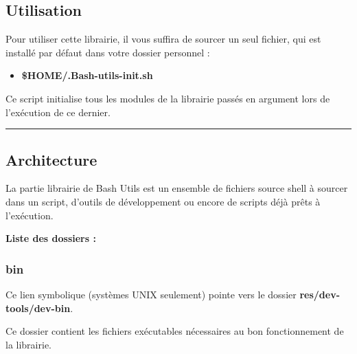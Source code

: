\documentclass[a4paper,10pt]{article}
\begin{document}
\color{sec2}
\subsection{Utilisation}\color{text}

\begin{justify}
    Pour utiliser cette librairie, il vous suffira de sourcer un seul fichier, qui est installé par défaut dans votre dossier personnel :

    \begin{itemize}
        \item \textbf{\color{vars}\$HOME\color{path}/.Bash-utils-init.sh}
    \end{itemize}
\end{justify}

\begin{justify}
    Ce script initialise tous les modules de la librairie passés en argument lors de l'exécution de ce dernier.
\end{justify}




\color{sec2}\par\noindent\rule{\textwidth}{0.4pt}\color{text}

\color{sec2}
\subsection{Architecture}\color{text}

\begin{justify}
    La partie librairie de Bash Utils est un ensemble de fichiers source shell à sourcer dans un script, d'outils de développement ou encore de scripts déjà prêts à l'exécution.
\end{justify}


\textbf{Liste des dossiers :}

\color{sec3}
\subsubsection{bin}\color{text}

\begin{justify}
    Ce lien symbolique (systèmes UNIX seulement) pointe vers le dossier \textbf{\color{path}res/dev-tools/dev-bin}.
\end{justify}

\begin{justify}
    Ce dossier contient les fichiers exécutables nécessaires au bon fonctionnement de la librairie.
\end{justify}
\end{document}
